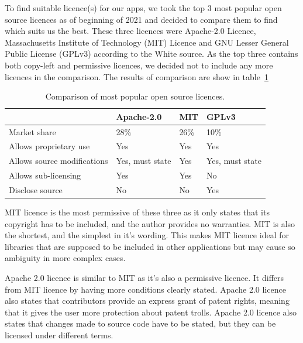 To find suitable licence(s) for our apps, we took the top 3 most popular open source licences as of beginning of 2021 and decided
to compare them to find which suits us the best.
These three licences were Apache-2.0 Licence, Massachusetts Institute of Technology (MIT) Licence and GNU Lesser General Public License (GPLv3) according to the White source.
As the top three contains both copy-left and permissive licences, we decided not to include any more licences in the comparison.
\cite{open-source-licences}
The results of comparison are show in table~\ref{tab:open-source-licence-comparison}
\begin{table}[H]
    \centering
    \begin{tabular}{ | p{4cm} | p{2cm} | p{2cm} | p{2cm} |}
        \hline
         & \textbf{Apache-2.0} & \textbf{MIT} & \textbf{GPLv3}\\
        \hline
        Market share & 28\% & 26\% & 10\% \\
        \hline
        Allows proprietary use & Yes & Yes & Yes\\
        \hline
        Allows source modifications & Yes, must state & Yes & Yes, must state\\
        \hline
        Allows sub-licensing & Yes & Yes & No\\
        \hline
        Disclose source & No & No & Yes\\
        \hline
    \end{tabular}
    \caption{Comparison of most popular open source licences.}
    \label{tab:open-source-licence-comparison}
\end{table}

MIT licence is the most permissive of these three as it only states that its copyright has to be included, and
the author provides no warranties.
MIT is also the shortest, and the simplest in it's wording.
This makes MIT licence ideal for libraries that are supposed to be included in other applications but may cause
so ambiguity in more complex cases.
\cite{mit-licences}

Apache 2.0 licence is similar to MIT as it's also a permissive licence.
It differs from MIT licence by having more conditions clearly stated.
Apache 2.0 licence also states that contributors provide an express grant of patent rights, meaning that it gives
the user more protection about patent trolls.
Apache 2.0 licence also states that changes made to source code have to be stated, but they can be licensed under different terms.
\cite{apache-2-licences}

